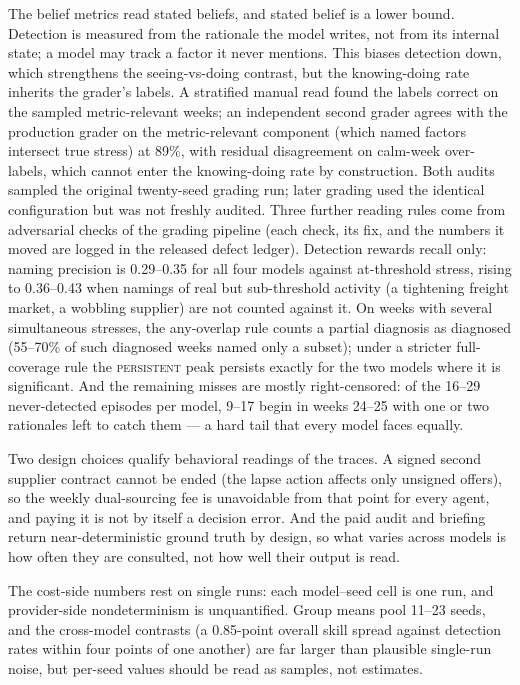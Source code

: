 \documentclass{article}
\begin{document}
The belief metrics read stated beliefs, and stated belief is a lower bound.
Detection is measured from the rationale the model writes, not from its
internal state; a model may track a factor it never mentions. This biases
detection down, which strengthens the seeing-vs-doing contrast, but the
knowing-doing rate inherits the grader's labels. A stratified manual read
found the labels correct on the sampled metric-relevant weeks; an
independent second grader agrees with the production grader on the
metric-relevant component (which named factors intersect true stress) at
89\%, with residual disagreement on calm-week over-labels, which cannot
enter the knowing-doing rate by construction. Both audits sampled the
original twenty-seed grading run; later grading used the identical
configuration but was not freshly audited. Three further reading rules
come from adversarial checks of the grading pipeline (each check, its
fix, and the numbers it moved are logged in the released defect ledger).
Detection rewards recall only: naming precision is 0.29--0.35 for all
four models against at-threshold stress, rising to 0.36--0.43 when
namings of real but sub-threshold activity (a tightening freight market,
a wobbling supplier) are not counted against it. On weeks with several
simultaneous stresses, the any-overlap rule counts a partial diagnosis as
diagnosed (55--70\% of such diagnosed weeks named only a subset); under a
stricter full-coverage rule the \textsc{persistent} peak persists exactly
for the two models where it is significant. And the remaining misses are
mostly right-censored: of the 16--29 never-detected episodes per model,
9--17 begin in weeks 24--25 with one or two rationales left to catch them
--- a hard tail that every model faces equally.

Two design choices qualify behavioral readings of the traces. A signed
second supplier contract cannot be ended (the lapse action affects only
unsigned offers), so the weekly dual-sourcing fee is unavoidable from
that point for every agent, and paying it is not by itself a decision
error. And the paid audit and briefing return near-deterministic ground
truth by design, so what varies across models is how often they are
consulted, not how well their output is read.

The cost-side numbers rest on single runs: each model--seed cell is one
run, and provider-side nondeterminism is unquantified. Group means pool
11--23 seeds, and the cross-model contrasts (a 0.85-point overall skill
spread against detection rates within four points of one another) are far
larger than plausible single-run noise, but per-seed values should be
read as samples, not estimates.
\end{document}
